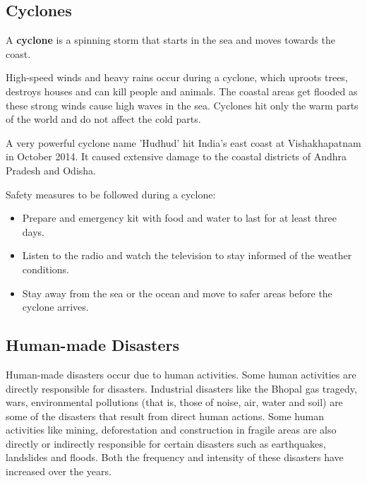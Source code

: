 \subsection{\textbf{Cyclones}}
A \textbf{cyclone} is a spinning storm that starts in the sea and moves towards the coast.
\vspace{0.1in}
\par
High-speed winds and heavy rains occur during a cyclone, which uproots trees, destroys houses and can kill people and animals. The coastal areas get flooded as these strong winds cause high waves in the sea. Cyclones hit only the warm parts of the world and do not affect the cold parts.
\vspace{0.1in}
\par
A very powerful cyclone name 'Hudhud' hit India's east coast at Vishakhapatnam in October 2014. It caused extensive damage to the coastal districts of Andhra Pradesh and Odisha.
\vspace{0.1in}
\par
Safety measures to be followed during a cyclone:
\begin{itemize}
    \item Prepare and emergency kit with food and water to last for at least three days.
    \item Listen to the radio and watch the television to stay informed of the weather conditions.
    \item Stay away from the sea or the ocean and move to safer areas before the cyclone arrives.
\end{itemize}
\subsection{Human-made Disasters}
Human-made disasters occur due to human activities. Some human activities are directly responsible for disasters. Industrial disasters like the Bhopal gas tragedy, wars, environmental pollutions (that is, those of noise, air, water and soil) are some of the disasters that result from direct human actions. Some human activities like mining, deforestation and construction in fragile areas are also directly or indirectly responsible for certain disasters such as earthquakes, landslides and floods. Both the frequency and intensity of these disasters have increased over the years.
\vspace{1.6in}
